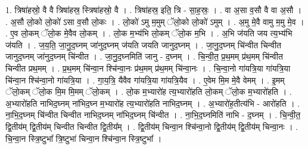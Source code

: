 \documentclass[17pt]{extarticle}
\begin{document}
1. त्रिषा॑हस्रो॒ वै वै त्रिषा॑हस्र॒ स्त्रिषा॑हस्रो॒ वै । . त्रिषा॑हस्र॒ इति॒ त्रि - सा॒ह॒स्रः॒ । . वा अ॒सा व॒सौ वै वा अ॒सौ । . अ॒सौ लो॒को लो॒को॑ ऽसा व॒सौ लो॒कः । . लो॒को॑ ऽमु म॒मुम् ॅलो॒को लो॒को॑ ऽमुम् । . अ॒मु मे॒वै वामु म॒मु मे॒व । . ए॒व लो॒कम् ॅलो॒क मे॒वैव लो॒कम् । . लो॒क म॒भ्य॑भि लो॒कम् ॅलो॒क म॒भि । . अ॒भि ज॑यति जय त्य॒भ्य॑भि ज॑यति । . ज॒य॒ति॒ जा॒नु॒द॒घ्नम् जा॑नुद॒घ्नम् ज॑यति जयति जानुद॒घ्नम् । . जा॒नु॒द॒घ्नम् चि॑न्वीत चिन्वीत जानुद॒घ्नम् जा॑नुद॒घ्नम् चि॑न्वीत । . जा॒नु॒द॒घ्नमिति॑ जानु - द॒घ्नम् । . चि॒न्वी॒त॒ प्र॒थ॒मम् प्र॑थ॒मम् चि॑न्वीत चिन्वीत प्रथ॒मम् । . प्र॒थ॒मम् चि॑न्वा॒न श्चि॑न्वा॒नः प्र॑थ॒मम् प्र॑थ॒मम् चि॑न्वा॒नः । . चि॒न्वा॒नो गा॑यत्रि॒या गा॑यत्रि॒या चि॑न्वा॒न श्चि॑न्वा॒नो गा॑यत्रि॒या । . गा॒य॒त्रि॒ यैवैव गा॑यत्रि॒या गा॑यत्रि॒यैव । . ए॒वेम मि॒म मे॒वै वेमम् । . इ॒मम् ॅलो॒कम् ॅलो॒क मि॒म मि॒मम् ॅलो॒कम् । . लो॒क म॒भ्यारो॑ह त्य॒भ्यारो॑हति लो॒कम् ॅलो॒क म॒भ्यारो॑हति । . अ॒भ्यारो॑हति नाभिद॒घ्नम् ना॑भिद॒घ्न म॒भ्यारो॑ह त्य॒भ्यारो॑हति नाभिद॒घ्नम् । . अ॒भ्यारो॑ह॒तीत्य॑भि - आरो॑हति । . ना॒भि॒द॒घ्नम् चि॑न्वीत चिन्वीत नाभिद॒घ्नम् ना॑भिद॒घ्नम् चि॑न्वीत । . ना॒भि॒द॒घ्नमिति॑ नाभि - द॒घ्नम् । . चि॒न्वी॒त॒ द्वि॒तीय॑म् द्वि॒तीय॑म् चिन्वीत चिन्वीत द्वि॒तीय᳚म् । . द्वि॒तीय॑म् चिन्वा॒न श्चि॑न्वा॒नो द्वि॒तीय॑म् द्वि॒तीय॑म् चिन्वा॒नः । . चि॒न्वा॒न स्त्रि॒ष्टुभा᳚ त्रि॒ष्टुभा॑ चिन्वा॒न श्चि॑न्वा॒न स्त्रि॒ष्टुभा᳚ । \newline
\end{document}
